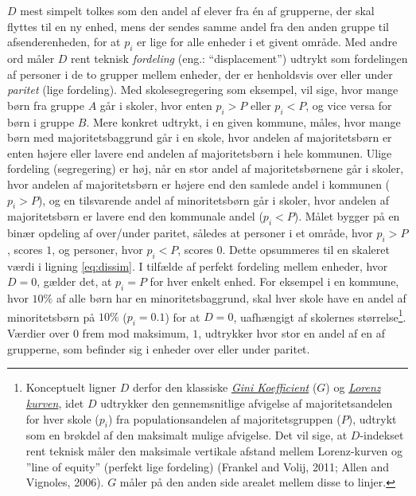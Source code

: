 \documentclass[
]{book}
\begin{document}
\(D\) mest simpelt tolkes som den andel af elever fra én af grupperne, der skal flyttes til en ny enhed, mens der sendes samme andel fra den anden gruppe til afsenderenheden, for at \(p_{i}\) er lige for alle enheder i et givent område. Med andre ord måler \(D\) rent teknisk \emph{fordeling} (eng.: ``displacement'') udtrykt som fordelingen af personer i de to grupper mellem enheder, der er henholdsvis over eller under \emph{paritet} (lige fordeling). Med skolesegregering som eksempel, vil sige, hvor mange børn fra gruppe \(A\) går i skoler, hvor enten \(p_{i}>P\) eller \(p_{i}<P\), og vice versa for børn i gruppe \(B\). Mere konkret udtrykt, i en given kommune, måles, hvor mange børn med majoritetsbaggrund går i en skole, hvor andelen af majoritetsbørn er enten højere eller lavere end andelen af majoritetsbørn i hele kommunen. Ulige fordeling (segregering) er høj, når en stor andel af majoritetsbørnene går i skoler, hvor andelen af majoritetsbørn er højere end den samlede andel i kommunen (\(p_{i} > P\)), og en tilsvarende andel af minoritetsbørn går i skoler, hvor andelen af majoritetsbørn er lavere end den kommunale andel (\(p_{i} < P\)). Målet bygger på en binær opdeling af over/under paritet, således at personer i et område, hvor \(p_{i}>P\), scores \(1\), og personer, hvor \(p_{i}<P\), scores \(0\). Dette opsummeres til en skaleret værdi i ligning \eqref{eq:dissim}. I tilfælde af perfekt fordeling mellem enheder, hvor \(D=0\), gælder det, at \(p_{i}=P\) for hver enkelt enhed. For eksempel i en kommune, hvor \(10\%\) af alle børn har en minoritetsbaggrund, skal hver skole have en andel af minoritetsbørn på \(10\%\) (\(p_{i}=0.1\)) for at \(D=0\), uafhængigt af skolernes størrelse\footnote{Konceptuelt ligner \(D\) derfor den klassiske \href{https://da.wikipedia.org/wiki/Gini-koefficient}{\emph{Gini Koefficient}} (\(G\)) og \href{https://da.wikipedia.org/wiki/Lorenz-kurve}{\emph{Lorenz kurven}}, idet \(D\) udtrykker den gennemsnitlige afvigelse af majoritetsandelen for hver skole (\(p_{i}\)) fra populationsandelen af majoritetsgruppen (\(P\)), udtrykt som en brøkdel af den maksimalt mulige afvigelse. Det vil sige, at \(D\)-indekset rent teknisk måler den maksimale vertikale afstand mellem Lorenz-kurven og ''line of equity'' (perfekt lige fordeling) (Frankel and Volij, 2011; Allen and Vignoles, 2006). \(G\) måler på den anden side arealet mellem disse to linjer.}. Værdier over \(0\) frem mod maksimum, \(1\), udtrykker hvor stor en andel af en af grupperne, som befinder sig i enheder over eller under paritet.
\end{document}
